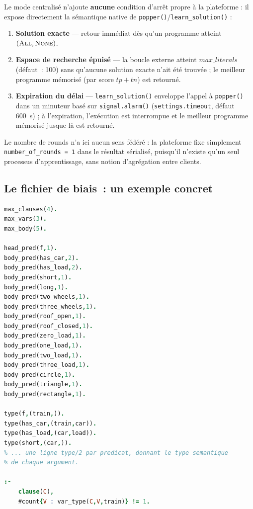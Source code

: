 Le mode centralisé n'ajoute \textbf{aucune} condition d'arrêt propre à
la plateforme : il expose directement la sémantique native de
\texttt{popper()}/\texttt{learn\_solution()} :

\begin{enumerate}
  \item \textbf{Solution exacte} --- retour immédiat dès qu'un
    programme atteint $(\textsc{All}, \textsc{None})$.
  \item \textbf{Espace de recherche épuisé} --- la boucle externe
    atteint $\mathit{max\_literals}$ (défaut~: 100) sans qu'aucune
    solution exacte n'ait été trouvée ; le meilleur programme mémorisé
    (par score $\mathit{tp}+\mathit{tn}$) est retourné.
  \item \textbf{Expiration du délai} --- \texttt{learn\_solution()}
    enveloppe l'appel à \texttt{popper()} dans un minuteur basé sur
    \texttt{signal.alarm()} (\texttt{settings.timeout}, défaut 600~s) ;
    à l'expiration, l'exécution est interrompue et le meilleur
    programme mémorisé jusque-là est retourné.
\end{enumerate}

Le nombre de \og rounds \fg{} n'a ici aucun sens fédéré : la
plateforme fixe simplement \texttt{number\_of\_rounds = 1} dans le
résultat sérialisé, puisqu'il n'existe qu'un seul processus
d'apprentissage, sans notion d'agrégation entre clients.

\subsection{Le fichier de biais~: un exemple concret}
\label{sec:popper-bias}

\begin{lstlisting}[language=Prolog, basicstyle=\small\ttfamily, breaklines=true, caption={Extrait d'un \texttt{bias.pl} (jeu de données \emph{trains})}]
max_clauses(4).
max_vars(3).
max_body(5).

head_pred(f,1).
body_pred(has_car,2).
body_pred(has_load,2).
body_pred(short,1).
body_pred(long,1).
body_pred(two_wheels,1).
body_pred(three_wheels,1).
body_pred(roof_open,1).
body_pred(roof_closed,1).
body_pred(zero_load,1).
body_pred(one_load,1).
body_pred(two_load,1).
body_pred(three_load,1).
body_pred(circle,1).
body_pred(triangle,1).
body_pred(rectangle,1).

type(f,(train,)).
type(has_car,(train,car)).
type(has_load,(car,load)).
type(short,(car,)).
% ... une ligne type/2 par predicat, donnant le type semantique
% de chaque argument.

:-
    clause(C),
    #count{V : var_type(C,V,train)} != 1.
\end{lstlisting}

